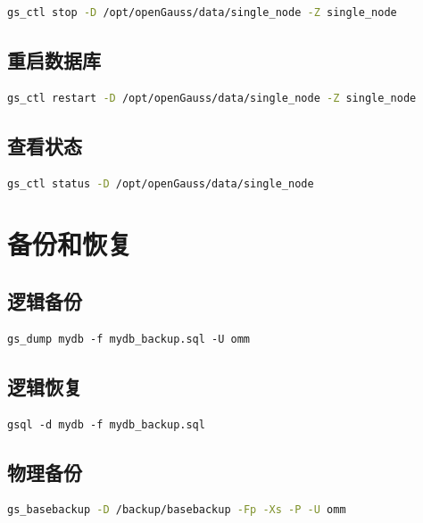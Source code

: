 \documentclass[12pt,UTF8]{ctexbook}
\begin{document}
\begin{lstlisting}[language=bash, caption=停止数据库]
gs_ctl stop -D /opt/openGauss/data/single_node -Z single_node
\end{lstlisting}

\subsection{重启数据库}

\begin{lstlisting}[language=bash, caption=重启数据库]
gs_ctl restart -D /opt/openGauss/data/single_node -Z single_node
\end{lstlisting}

\subsection{查看状态}

\begin{lstlisting}[language=bash, caption=查看数据库状态]
gs_ctl status -D /opt/openGauss/data/single_node
\end{lstlisting}

\section{备份和恢复}

\subsection{逻辑备份}

\begin{verbatim}
gs_dump mydb -f mydb_backup.sql -U omm
\end{verbatim}

\subsection{逻辑恢复}

\begin{verbatim}
gsql -d mydb -f mydb_backup.sql
\end{verbatim}

\subsection{物理备份}

\begin{lstlisting}[language=bash, caption=物理备份]
gs_basebackup -D /backup/basebackup -Fp -Xs -P -U omm
\end{lstlisting}
\end{document}
